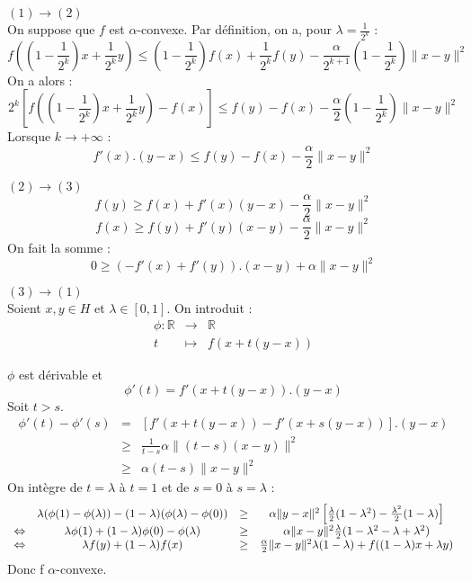 \begin{dem}
$(1)\to(2)$\\
On suppose que $f$ est $\alpha$-convexe. Par définition, on a, pour $\lambda=\frac{1}{2^k}$ : 
\[f\left(\left(1-\frac{1}{2^k}\right)x+\frac{1}{2^k}y\right)\leq \left(1-\frac{1}{2^k}\right) f(x)+\frac{1}{2^k}f(y)-\frac{\alpha}{2^{k+1}}\left(1-\frac{1}{2^k}\right)\|x-y\|^2\]
On a alors :
\[2^k\left[f\left(\left(1-\frac{1}{2^k}\right)x+\frac{1}{2^k}y\right)-f(x)\right]\leq f(y)-f(x)-\frac{\alpha}{2}\left(1-\frac{1}{2^k}\right)\|x-y\|^2\]
Lorsque $k\to +\infty$ : 
\[f'(x).(y-x)\leq f(y)-f(x)-\frac{\alpha}{2}\|x-y\|^2\]

\bigskip
$(2)\to (3)$\\
\[f(y)\geq f(x)+f'(x)(y-x)-\frac{\alpha}{2}\|x-y\|^2\]
\[f(x)\geq f(y)+f'(y)(x-y)-\frac{\alpha}{2}\|x-y\|^2\]
On fait la somme :
\[0\geq (-f'(x)+f'(y)).(x-y)+\alpha\|x-y\|^2\]

\bigskip
$(3)\to(1)$\\
Soient $x,y\in H$ et $\lambda\in[0,1]$. On introduit :
\begin{eqnarray*}
\phi : \mathbb{R}&\to&\mathbb{R}\\
	t&\mapsto&f(x+t(y-x))
\end{eqnarray*}

$\phi$ est dérivable et \[\phi'(t)=f'(x+t(y-x)).(y-x)\]
Soit $t>s$. 
\begin{eqnarray*}
\phi'(t)-\phi'(s)&=&[f'(x+t(y-x))-f'(x+s(y-x))].(y-x) \\
	&\geq& \frac{1}{t-s}\alpha\|(t-s)(x-y)\|^2\\
	&\geq& \alpha(t-s)\|x-y\|^2
\end{eqnarray*}
On intègre de $t=\lambda$ à $t=1$ et de $s=0$ à $s=\lambda$ :
\[\begin{array}{c c c c}
 & \lambda(\phi(1)-\phi(\lambda))-(1-\lambda)(\phi(\lambda)-\phi(0)) &\geq& \alpha\|y-x\|^2\left[ \frac{\lambda}{2} (1-\lambda^2) - \frac{\lambda^2}{2}(1-\lambda)\right]\\
\Leftrightarrow & \lambda\phi(1)+(1-\lambda)\phi(0)-\phi(\lambda) &\geq& \alpha\|x-y\|^2\frac{\lambda}{2}(1-\lambda^2-\lambda+\lambda^2)\\
\Leftrightarrow & \lambda f(y) + (1-\lambda)f(x)&\geq& \frac{\alpha}{2}\|x-y\|^2\lambda(1-\lambda)+f((1-\lambda)x+\lambda y)
\end{array}\]
Donc f $\alpha$-convexe.
\end{dem}
